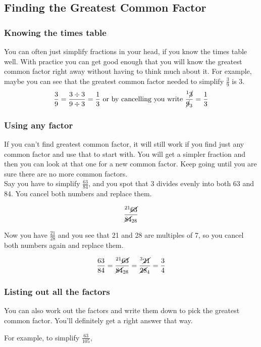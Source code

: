 \documentclass[16pt]{article}
\begin{document}
\begin{spacing}{1.25}
\subsection*{Finding the Greatest Common Factor}

\subsubsection*{Knowing the times table} You can often just simplify fractions in your head, if you know the times table well. With practice you can get good enough that you will know the greatest common factor right away without having to think much about it.
For example, maybe you can see that the greatest common factor needed to simplify $\frac{3}{9}$ is 3.
$$\frac{3}{9} = \frac{3 \div 3}{9 \div 3} = \frac{1}{3} \text{   or by cancelling you write }\frac{^1\cancel{3}}{\cancel{9}_3} = \frac{1}{3}$$

\subsubsection*{Using any factor} If you can't find greatest common factor, it will still work if you find just any common factor and use that to start with. You will get a simpler fraction and then you can look at that one for a new common factor. Keep going until you are sure there are no more common factors.\\

Say you have to simplify $\frac{63}{84}$, and you spot that 3 divides evenly into both 63 and 84. You cancel both numbers and replace them.

$$\frac{^{21}\cancel{63}}{\cancel{84}_{28}}$$

Now you have $\frac{21}{28}$ and you see that 21 and 28 are multiples of 7, so you cancel both numbers again and replace them.

$$\frac{63}{84} = \frac{^{21}\cancel{63}}{\cancel{84}_{28}} = \frac{^3\cancel{21}}{\cancel{28}_4} = \frac{3}{4}$$

\pagebreak

\subsubsection*{Listing out all the factors}
You can also work out the factors and write them down to pick the greatest common factor. You’ll definitely get a right answer that way.

\vspace{28pt}
For example, to simplify $\frac{63}{105}$,


\end{spacing}
\end{document}
